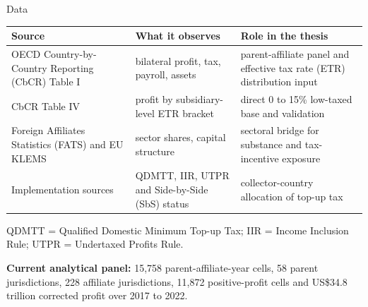 \documentclass[aspectratio=169, 11pt]{beamer}
\newcommand{\emphbx}[1]{\textcolor{Bordeaux}{\textbf{#1}}}
\begin{document}
\begin{frame}{Data}
\begin{center}
\scriptsize
\begin{tabular}{@{}L{3.0cm}L{3.65cm}L{4.85cm}@{}}
  \toprule
  \textbf{Source} & \textbf{What it observes} & \textbf{Role in the thesis} \\
  \midrule
  OECD Country-by-Country Reporting (CbCR) Table I & bilateral profit, tax, payroll, assets & parent-affiliate panel and effective tax rate (ETR) distribution input \\
  CbCR Table IV & profit by subsidiary-level ETR bracket & direct 0 to 15\% low-taxed base and validation \\
  Foreign Affiliates Statistics (FATS) and EU KLEMS & sector shares, capital structure & sectoral bridge for substance and tax-incentive exposure \\
  Implementation sources & QDMTT, IIR, UTPR and Side-by-Side (SbS) status & collector-country allocation of top-up tax \\
  \bottomrule
\end{tabular}
\end{center}

\vspace{0.2em}
\centering
\tiny QDMTT = Qualified Domestic Minimum Top-up Tax; IIR = Income Inclusion Rule; UTPR = Undertaxed Profits Rule.

\vspace{0.25em}
\small
\emphbx{Current analytical panel:} 15,758 parent-affiliate-year cells, 58 parent jurisdictions, 228 affiliate jurisdictions, 11,872 positive-profit cells and US\$34.8 trillion corrected profit over 2017 to 2022.
\end{frame}
\end{document}
